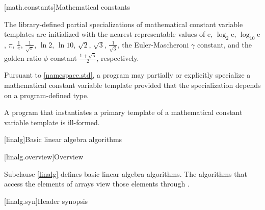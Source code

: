 [math.constants]{Mathematical constants}

\pnum
The library-defined partial specializations
of mathematical constant variable templates
are initialized with the nearest representable values of
$\mathrm{e}$,
$\log_{2} \mathrm{e}$,
$\log_{10} \mathrm{e}$,
$\pi$,
$\frac{1}{\pi}$,
$\frac{1}{\sqrt{\pi}}$,
$\ln 2$,
$\ln 10$,
$\sqrt{2}$,
$\sqrt{3}$,
$\frac{1}{\sqrt{3}}$,
the Euler-Mascheroni $\gamma$ constant, and
the golden ratio $\phi$ constant $\frac{1+\sqrt{5}}{2}$,
respectively.

\pnum
Pursuant to \ref{namespace.std},
a program may partially or explicitly specialize
a mathematical constant variable template
provided that the specialization depends on a program-defined type.

\pnum
A program that instantiates a primary template
of a mathematical constant variable template is ill-formed.

[linalg]{Basic linear algebra algorithms}

[linalg.overview]{Overview}

\pnum
Subclause \ref{linalg} defines basic linear algebra algorithms.
The algorithms that access the elements of arrays
view those elements through .

[linalg.syn]{Header  synopsis}

